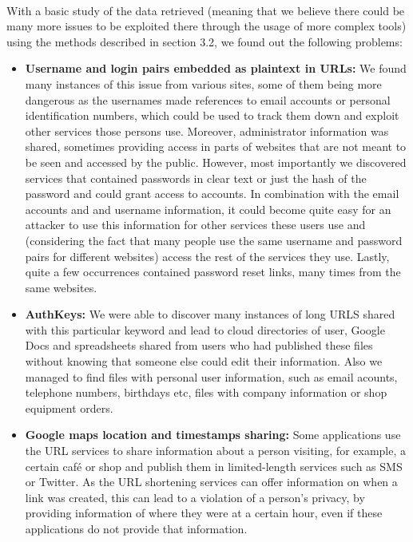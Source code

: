 \documentclass[12pt]{article}
\begin{document}
\paragraph{}
With a basic study of the data retrieved (meaning that we believe there could be many more issues to be exploited there through the usage of more complex tools) using the methods described in section 3.2, we found out the following problems:

\begin{itemize}

\item \textbf{Username and login pairs embedded as plaintext in URLs:} We found many instances of this issue from various sites, some of them being more dangerous as the usernames made references to email accounts or personal identification numbers, which could be used to track them down and exploit other services those persons use. Moreover, administrator information was shared, sometimes providing access in parts of websites that are not meant to be seen and accessed by the public. However, most importantly we discovered services that contained passwords in clear text or just the hash of the password and could grant access to accounts. In combination with the email accounts and and username information, it could become quite easy for an attacker to use this information for other services these users use and (considering the fact that many people use the same username and password pairs for different websites) access the rest of the services they use. Lastly, quite a few occurrences contained password reset links, many times from the same websites.

\item \textbf{AuthKeys:} We were able to discover many instances of long URLS shared with this particular keyword and lead to cloud directories of user, Google Docs and spreadsheets shared from users who had published these files without knowing that someone else could edit their information. Also we managed to find files with personal user information, such as email acounts, telephone numbers, birthdays etc, files with company information or shop equipment orders.

\item \textbf{Google maps location and timestamps sharing:} Some applications use the URL services to share information about a person visiting, for example, a certain café or shop and publish them in limited-length services such as SMS or Twitter. As the URL shortening services can offer information on when a link was created, this can lead to a violation of a person's privacy, by providing information of where they were at a certain hour, even if these applications do not provide that information.


\end{itemize}
\end{document}
